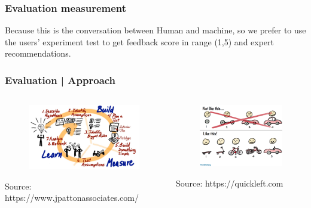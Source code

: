 \documentclass{beamer}
\begin{document}
\begin{frame}
\frametitle{Evaluation measurement}
Because this is the conversation between Human and machine, so we prefer to use the users' experiment test to get feedback score in range (1,5) and expert recommendations.


\end{frame}

\begin{frame}
\frametitle{Evaluation | Approach }


\begin{columns}[onlytextwidth]
	\begin{column}{.45\textwidth}
		\begin{figure}
			\includegraphics[width=\textwidth]{lsm}
		\end{figure}
		{\tiny 	Source: https://www.jpattonassociates.com/}
	\end{column}
	\hfill
	\begin{column}{.45\textwidth}
		\begin{figure}
			\includegraphics[width=.8\textwidth]{mvp}
		\end{figure}
		{\tiny 	Source: https://quickleft.com}
	\end{column}
\end{columns}


\end{frame}
\end{document}
